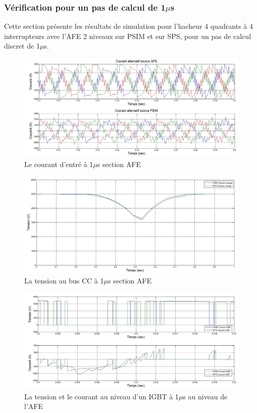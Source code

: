 \documentclass[11pt,letterpaper,final]{report}
\begin{document}
\subsubsection{Vérification pour un pas de calcul de 1$\mu$s}
Cette section présente les résultats de simulation pour l'hacheur 4 quadrants à 4 interrupteurs avec l'AFE 2 niveaux sur PSIM et sur SPS, pour un pas de calcul discret de 1$\mu$s. 


\begin{figure}[htb]
\centering
\includegraphics[scale=0.5]{Fig/Hach_AFE/1u/cour_al.jpg}
\caption{Le courant d'entré à 1$\mu$s section AFE}
\label{AF_HA_cou1}
\end{figure}


\begin{figure}[htb]
\centering
\includegraphics[scale=0.5]{Fig/Hach_AFE/1u/ten_bus.jpg}
\caption{La tension au bus CC à 1$\mu$s section AFE}
\label{AF_HA_vch1}
\end{figure}



\begin{figure}[htb]
\centering
\includegraphics[scale=0.5]{Fig/Hach_AFE/1u/IGBT_AFE.jpg}
\caption{La tension et le courant au niveau d'un IGBT à 1$\mu$s au niveau de l'AFE}
\label{AF_HA_IGBT1}
\end{figure}
\end{document}
